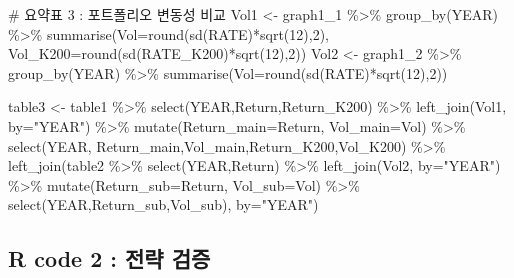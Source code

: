 \documentclass[
  a4paper,
  DIV=11,
  numbers=noendperiod]{scrreprt}
\newenvironment{Shaded}{\begin{snugshade}}{\end{snugshade}}
\newcommand{\AttributeTok}[1]{\textcolor[rgb]{0.40,0.45,0.13}{#1}}
\newcommand{\CommentTok}[1]{\textcolor[rgb]{0.37,0.37,0.37}{#1}}
\newcommand{\DecValTok}[1]{\textcolor[rgb]{0.68,0.00,0.00}{#1}}
\newcommand{\FunctionTok}[1]{\textcolor[rgb]{0.28,0.35,0.67}{#1}}
\newcommand{\NormalTok}[1]{\textcolor[rgb]{0.00,0.23,0.31}{#1}}
\newcommand{\OtherTok}[1]{\textcolor[rgb]{0.00,0.23,0.31}{#1}}
\newcommand{\SpecialCharTok}[1]{\textcolor[rgb]{0.37,0.37,0.37}{#1}}
\newcommand{\StringTok}[1]{\textcolor[rgb]{0.13,0.47,0.30}{#1}}
\begin{document}
\begin{Shaded}
\begin{Highlighting}[]
\CommentTok{\# 요약표 3 : 포트폴리오 변동성 비교}
\NormalTok{Vol1 }\OtherTok{\textless{}{-}}\NormalTok{ graph1\_1 }\SpecialCharTok{\%\textgreater{}\%} \FunctionTok{group\_by}\NormalTok{(YEAR) }\SpecialCharTok{\%\textgreater{}\%} \FunctionTok{summarise}\NormalTok{(}\AttributeTok{Vol=}\FunctionTok{round}\NormalTok{(}\FunctionTok{sd}\NormalTok{(RATE)}\SpecialCharTok{*}\FunctionTok{sqrt}\NormalTok{(}\DecValTok{12}\NormalTok{),}\DecValTok{2}\NormalTok{),}
                                                  \AttributeTok{Vol\_K200=}\FunctionTok{round}\NormalTok{(}\FunctionTok{sd}\NormalTok{(RATE\_K200)}\SpecialCharTok{*}\FunctionTok{sqrt}\NormalTok{(}\DecValTok{12}\NormalTok{),}\DecValTok{2}\NormalTok{))}
\NormalTok{Vol2 }\OtherTok{\textless{}{-}}\NormalTok{ graph1\_2 }\SpecialCharTok{\%\textgreater{}\%} \FunctionTok{group\_by}\NormalTok{(YEAR) }\SpecialCharTok{\%\textgreater{}\%} \FunctionTok{summarise}\NormalTok{(}\AttributeTok{Vol=}\FunctionTok{round}\NormalTok{(}\FunctionTok{sd}\NormalTok{(RATE)}\SpecialCharTok{*}\FunctionTok{sqrt}\NormalTok{(}\DecValTok{12}\NormalTok{),}\DecValTok{2}\NormalTok{))}

\NormalTok{table3 }\OtherTok{\textless{}{-}}\NormalTok{ table1 }\SpecialCharTok{\%\textgreater{}\%} 
  \FunctionTok{select}\NormalTok{(YEAR,Return,Return\_K200) }\SpecialCharTok{\%\textgreater{}\%} 
  \FunctionTok{left\_join}\NormalTok{(Vol1, }\AttributeTok{by=}\StringTok{"YEAR"}\NormalTok{) }\SpecialCharTok{\%\textgreater{}\%} 
  \FunctionTok{mutate}\NormalTok{(}\AttributeTok{Return\_main=}\NormalTok{Return,}
         \AttributeTok{Vol\_main=}\NormalTok{Vol) }\SpecialCharTok{\%\textgreater{}\%} 
  \FunctionTok{select}\NormalTok{(YEAR, Return\_main,Vol\_main,Return\_K200,Vol\_K200) }\SpecialCharTok{\%\textgreater{}\%} 
  \FunctionTok{left\_join}\NormalTok{(table2 }\SpecialCharTok{\%\textgreater{}\%} 
              \FunctionTok{select}\NormalTok{(YEAR,Return) }\SpecialCharTok{\%\textgreater{}\%} 
              \FunctionTok{left\_join}\NormalTok{(Vol2, }\AttributeTok{by=}\StringTok{"YEAR"}\NormalTok{) }\SpecialCharTok{\%\textgreater{}\%} 
              \FunctionTok{mutate}\NormalTok{(}\AttributeTok{Return\_sub=}\NormalTok{Return,}
                     \AttributeTok{Vol\_sub=}\NormalTok{Vol) }\SpecialCharTok{\%\textgreater{}\%} 
              \FunctionTok{select}\NormalTok{(YEAR,Return\_sub,Vol\_sub), }\AttributeTok{by=}\StringTok{"YEAR"}\NormalTok{)}
\end{Highlighting}
\end{Shaded}

\subsection*{R code 2 : 전략
검증}\label{r-code-2-uxc804uxb7b5-uxac80uxc99d}
\end{document}
